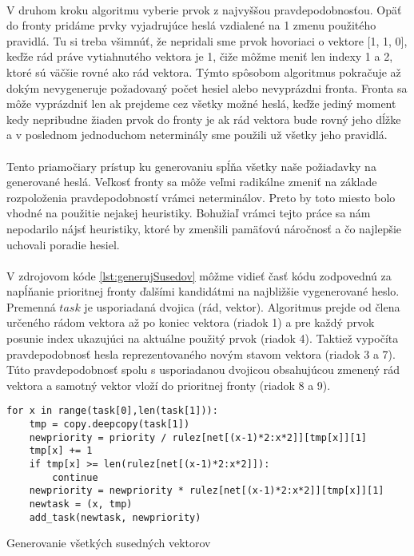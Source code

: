 \paragraph{}
V druhom kroku algoritmu vyberie prvok z najvyššou pravdepodobnosťou. Opäť do fronty pridáme prvky vyjadrujúce heslá vzdialené na 1 zmenu použitého pravidlá. Tu si treba všimnúť, že nepridali sme prvok hovoriaci o vektore [1, 1, 0], keďže rád práve vytiahnutého vektora je 1, čiže môžme meniť len indexy 1 a 2, ktoré sú väčšie rovné ako rád vektora. Týmto spôsobom algoritmus pokračuje až dokým nevygeneruje požadovaný počet hesiel alebo nevyprázdni fronta. Fronta sa môže vyprázdniť len ak prejdeme cez všetky možné heslá, keďže jediný moment kedy nepribudne žiaden prvok do fronty je ak rád vektora bude rovný jeho dĺžke a v poslednom jednoduchom neterminály sme použili už všetky jeho pravidlá.

\paragraph{}
Tento priamočiary prístup ku generovaniu spĺňa všetky naše požiadavky na generované heslá. Veľkosť fronty sa môže veľmi radikálne zmeniť na základe rozpoloženia pravdepodobností vrámci neterminálov. Preto by toto miesto bolo vhodné na použitie nejakej heuristiky. Bohužiaľ vrámci tejto práce sa nám nepodarilo nájsť heuristiky, ktoré by zmenšili pamäťovú náročnosť a čo najlepšie uchovali poradie hesiel.
\paragraph{}
V zdrojovom kóde \ref{lst:generujSusedov} môžme vidieť časť kódu zodpovednú za napĺňanie prioritnej fronty ďalšími kandidátmi na najbližšie vygenerované heslo. Premenná \(task\) je usporiadaná dvojica (rád, vektor). Algoritmus prejde od člena určeného rádom vektora až po koniec vektora (riadok 1) a pre každý prvok posunie index ukazujúci na aktuálne použitý prvok (riadok 4). Taktiež vypočíta pravdepodobnosť hesla reprezentovaného novým stavom vektora (riadok 3 a 7). Túto pravdepodobnosť spolu s usporiadanou dvojicou obsahujúcou zmenený rád vektora a samotný vektor vloží do prioritnej fronty (riadok 8 a 9).

\begin{listing}
\begin{verbatim}
for x in range(task[0],len(task[1])):
	tmp = copy.deepcopy(task[1])
	newpriority = priority / rulez[net[(x-1)*2:x*2]][tmp[x]][1]
	tmp[x] += 1
	if tmp[x] >= len(rulez[net[(x-1)*2:x*2]]):
		continue
	newpriority = newpriority * rulez[net[(x-1)*2:x*2]][tmp[x]][1]
	newtask = (x, tmp)
	add_task(newtask, newpriority)
\end{verbatim}
\caption{Generovanie všetkých susedných vektorov}
\label{lst:generujSusedov}
\end{listing}

